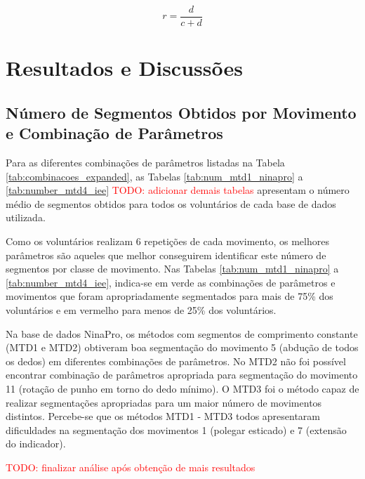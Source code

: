 \begin{equation}
\label{eq:sensitividade}
	r = \frac{d}{c+d}
\end{equation}


	\chapter{Resultados e Discussões}
		\section{Número de Segmentos Obtidos por Movimento e Combinação de Parâmetros}
Para as diferentes combinações de parâmetros listadas na Tabela \ref{tab:combinacoes_expanded}, as Tabelas \ref{tab:num_mtd1_ninapro} a \ref{tab:number_mtd4_iee} \textcolor{red}{TODO: adicionar demais tabelas} apresentam o número médio de segmentos obtidos para todos os voluntários de cada base de dados utilizada.

Como os voluntários realizam 6 repetições de cada movimento, os melhores parâmetros são aqueles que melhor conseguirem identificar este número de segmentos por classe de movimento. Nas Tabelas \ref{tab:num_mtd1_ninapro} a \ref{tab:number_mtd4_iee}, indica-se em verde as combinações de parâmetros e movimentos que foram apropriadamente segmentados para mais de 75\% dos voluntários e em vermelho para menos de 25\% dos voluntários.


%

Na base de dados NinaPro, os métodos com segmentos de comprimento constante (MTD1 e MTD2) obtiveram boa segmentação do movimento 5 (abdução de todos os dedos) em diferentes combinações de parâmetros. No MTD2 não foi possível encontrar combinação de parâmetros apropriada para segmentação do movimento 11 (rotação de punho em torno do dedo mínimo). O MTD3 foi o método capaz de realizar segmentações apropriadas para um maior número de movimentos distintos. Percebe-se que os métodos MTD1 - MTD3 todos apresentaram dificuldades na segmentação dos movimentos 1 (polegar esticado) e 7 (extensão do indicador).

\textcolor{red}{TODO: finalizar análise após obtenção de mais resultados}


